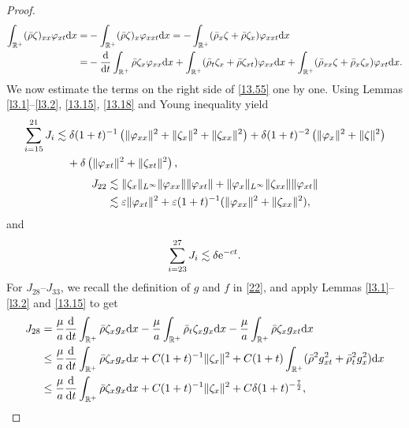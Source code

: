 \documentclass[11pt]{article}
\theoremstyle{plain}
\numberwithin{equation}{section}
\begin{document}
\begin{proof}
\begin{align}
		\int_{\mathbb{R}^+}(\bar\rho\zeta)_{xx}\varphi_{xt}{\rm d}x=&-\int_{\mathbb{R}^+}(\bar\rho\zeta)_x\varphi_{xxt}{\rm d}x=-\int_{\mathbb{R}^+}(\bar\rho_x\zeta+\bar\rho\zeta_x)\varphi_{xxt}{\rm d}x\notag\\ 
		=&-\frac{{\rm d}}{{\rm d}t}\int_{\mathbb{R}^+}\bar\rho\zeta_x\varphi_{xx}{\rm d}x+\int_{\mathbb{R}^+}(\bar\rho_t\zeta_x+\bar\rho\zeta_{xt})\varphi_{xx}{\rm d}x+\int_{\mathbb{R}^+}(\bar\rho_{xx}\zeta+\bar\rho_{x}\zeta_x)\varphi_{xt}{\rm d}x.\notag	
		\end{align}
		We now estimate the terms on the right side of \eqref{13.55} one by one. Using Lemmas \ref{l3.1}--\ref{l3.2}, \eqref{13.15}, \eqref{13.18} and Young inequality yield
		\begin{align}\label{13.56}
			\sum_{i=15}^{21}J_i&\lesssim
			\delta(1+t)^{-1}\left(\|\varphi_{xx}\|^2+\|\zeta_x\|^2+\|\zeta_{xx}\|^2\right)+\delta(1+t)^{-2}\left(\|\varphi_{x}\|^2+\|\zeta\|^2\right)\notag\\
			&\;\;\;\;+\delta\left(\|\varphi_{xt}\|^2+\|\zeta_{xt}\|^2\right),
		\end{align}
		\begin{align}\label{13.57}
			J_{22}
			&\lesssim\|\zeta_x\|_{L^{\infty}}\|\varphi_{xx}\|\|\varphi_{xt}\|+\|\varphi_x\|_{L^{\infty}}\|\zeta_{xx}\|\|\varphi_{xt}\|\notag\\
			&\lesssim \varepsilon\|\varphi_{xt}\|^2+\varepsilon(1+t)^{-1}(\|\varphi_{xx}\|^2+\|\zeta_{xx}\|^2),
		\end{align}
	and
		\begin{align}\label{13.58}
			\sum_{i=23}^{27}J_i\lesssim\delta{\rm e}^{-ct}.
		\end{align}
		For $J_{28}$--$J_{33}$, we recall the definition of $g$ and $f$ in \eqref{22}, and apply Lemmas \ref{l3.1}--\ref{l3.2} and \eqref{13.15} to get
		\begin{align}\label{13.59}
			J_{28}
			&=\frac{\mu}{a}\frac{{\rm d}}{{\rm d}t}\int_{\mathbb{R}^+}\bar\rho\zeta_x g_x{\rm d}x-\frac{\mu}{a}\int_{\mathbb{R}^+}\bar\rho_t\zeta_x g_x{\rm d}x-\frac{\mu}{a}\int_{\mathbb{R}^+}\bar\rho\zeta_x g_{xt}{\rm d}x\notag\\
			&\leq \frac{\mu}{a}\frac{{\rm d}}{{\rm d}t}\int_{\mathbb{R}^+}\bar\rho\zeta_x g_x{\rm d}x+C(1+t)^{-1}\|\zeta_x\|^2+C(1+t)\int_{\mathbb{R}^+}(\bar\rho^2g_{xt}^2+\bar\rho_t^2g_x^2){\rm d}x\notag\\
			&\leq \frac{\mu}{a}\frac{{\rm d}}{{\rm d}t}\int_{\mathbb{R}^+}\bar\rho\zeta_x g_x{\rm d}x+C(1+t)^{-1}\|\zeta_x\|^2+C\delta(1+t)^{-\frac{7}{2}},
		\end{align}

\end{proof}
\end{document}
